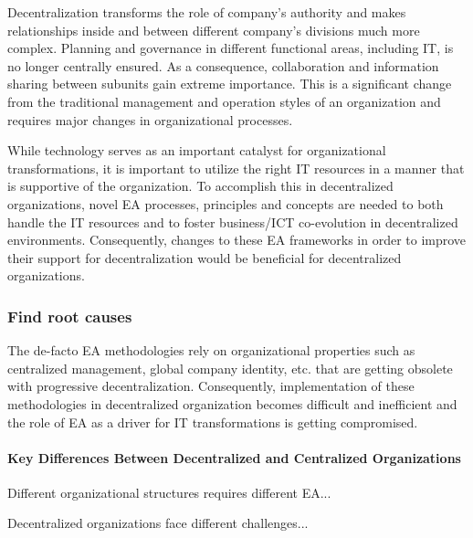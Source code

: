 Decentralization transforms the role of company's authority and makes relationships inside and between different company's divisions much more complex. Planning and governance in different functional areas, including IT,  is no longer centrally ensured. As a consequence, collaboration and information sharing between subunits gain extreme importance. This is a significant change from the traditional management and operation styles of an organization and requires major changes in organizational processes. 


While technology serves as an important catalyst for organizational transformations, it is important to utilize the right IT resources in a manner that is supportive of the organization. To accomplish this in decentralized organizations, novel EA processes, principles and concepts are needed to both handle the IT resources and to foster business/ICT co-evolution in decentralized environments. Consequently, changes to these EA frameworks in order to improve their support for decentralization would be beneficial for decentralized organizations. 




\subsubsection{Find root causes}

The de-facto EA methodologies rely on organizational properties such as centralized management, global company identity, etc.  that are getting obsolete with progressive decentralization.  Consequently, implementation of these methodologies in decentralized organization becomes difficult and inefficient and  the role of EA as a driver for IT transformations is getting compromised.



\paragraph*{Key Differences Between Decentralized and Centralized Organizations}

Different organizational structures requires different EA...
 
Decentralized organizations face different challenges...

